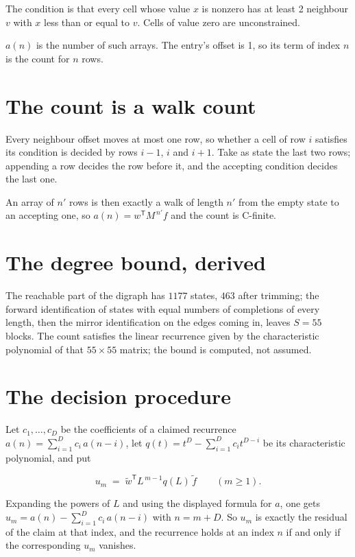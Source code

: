 \documentclass[11pt]{article}
\theoremstyle{definition}
\begin{document}
The condition is that every cell whose value $x$ is nonzero has at least 2 neighbour $v$ with $x$ less than or equal to $v$. Cells of value zero are unconstrained.

$a(n)$ is the number of such arrays. The entry's offset is 1, so its term of index $n$ is the count for $n$ rows.

\section{The count is a walk count}

Every neighbour offset moves at most one row, so whether a cell of row $i$ satisfies its condition is decided by rows $i-1$, $i$ and $i+1$. Take as state the last two rows; appending a row decides the row before it, and the accepting condition decides the last one.

An array of $n'$ rows is then exactly a walk of length $n'$ from the empty state to an accepting one, so $a(n) = w^{\mathsf T}M^{\,n'}f$ and the count is C-finite.

\section{The degree bound, derived}

The reachable part of the digraph has $1177$ states, $463$ after trimming; the forward identification of states with equal numbers of completions of every length, then the mirror identification on the edges coming in, leaves $S = 55$ blocks. The count satisfies the linear recurrence given by the characteristic polynomial of that $55\times55$ matrix; the bound is computed, not assumed.

\section{The decision procedure}

Let $c_1,\dots,c_D$ be the coefficients of a claimed recurrence $a(n) = \sum_{i=1}^{D} c_i\,a(n-i)$, let $q(t) = t^{D} - \sum_{i=1}^{D} c_i t^{D-i}$ be its characteristic polynomial, and put

\[u_m \;=\; \tilde w^{\mathsf T} L^{\,m-1} q(L)\,\tilde f \qquad (m \ge 1).\]

Expanding the powers of $L$ and using the displayed formula for $a$, one gets $u_m = a(n) - \sum_{i=1}^{D} c_i\,a(n-i)$ with $n = m + D$. So $u_m$ is exactly the residual of the claim at that index, and the recurrence holds at an index $n$ if and only if the corresponding $u_m$ vanishes.
\end{document}
